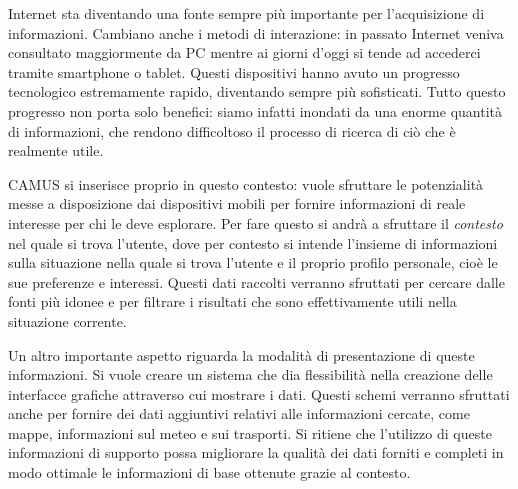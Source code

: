 Internet sta diventando una fonte sempre più importante per l'acquisizione di informazioni. Cambiano anche i metodi di interazione: in passato Internet veniva consultato maggiormente da PC mentre ai giorni d'oggi si tende ad accederci tramite smartphone o tablet. Questi dispositivi hanno avuto un progresso tecnologico estremamente rapido, diventando sempre più sofisticati. Tutto questo progresso non porta solo benefici: siamo infatti inondati da una enorme quantità di informazioni, che rendono difficoltoso il processo di ricerca di ciò che è realmente utile.

CAMUS si inserisce proprio in questo contesto: vuole sfruttare le potenzialità messe a disposizione dai dispositivi mobili per fornire informazioni di reale interesse per chi le deve esplorare. Per fare questo si andrà a sfruttare il \emph{contesto} nel quale si trova l'utente, dove per contesto si intende l'insieme di informazioni sulla situazione nella quale si trova l'utente e il proprio profilo personale, cioè le sue preferenze e interessi. Questi dati raccolti verranno sfruttati per cercare dalle fonti più idonee e per filtrare i risultati che sono effettivamente utili nella situazione corrente.

Un altro importante aspetto riguarda la modalità di presentazione di queste informazioni. Si vuole creare un sistema che dia flessibilità nella creazione delle interfacce grafiche attraverso cui mostrare i dati. Questi schemi verranno sfruttati anche per fornire dei dati aggiuntivi relativi alle informazioni cercate, come mappe, informazioni sul meteo e sui trasporti. Si ritiene che l'utilizzo di queste informazioni di supporto possa migliorare la qualità dei dati forniti e completi in modo ottimale le informazioni di base ottenute grazie al contesto.